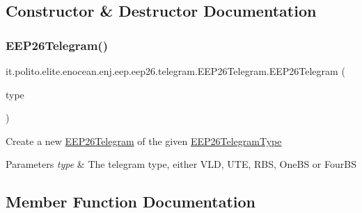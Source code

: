 \subsection{Constructor \& Destructor Documentation}
\hypertarget{classit_1_1polito_1_1elite_1_1enocean_1_1enj_1_1eep_1_1eep26_1_1telegram_1_1_e_e_p26_telegram_a880474d00eda1be1f7234ac34330d348}{}\label{classit_1_1polito_1_1elite_1_1enocean_1_1enj_1_1eep_1_1eep26_1_1telegram_1_1_e_e_p26_telegram_a880474d00eda1be1f7234ac34330d348} 
\subsubsection{\texorpdfstring{E\+E\+P26\+Telegram()}{EEP26Telegram()}}
{\footnotesize\ttfamily it.\+polito.\+elite.\+enocean.\+enj.\+eep.\+eep26.\+telegram.\+E\+E\+P26\+Telegram.\+E\+E\+P26\+Telegram (\begin{DoxyParamCaption}\item[{\hyperlink{enumit_1_1polito_1_1elite_1_1enocean_1_1enj_1_1eep_1_1eep26_1_1telegram_1_1_e_e_p26_telegram_type}{E\+E\+P26\+Telegram\+Type}}]{type }\end{DoxyParamCaption})}

Create a new \hyperlink{classit_1_1polito_1_1elite_1_1enocean_1_1enj_1_1eep_1_1eep26_1_1telegram_1_1_e_e_p26_telegram}{E\+E\+P26\+Telegram} of the given \hyperlink{enumit_1_1polito_1_1elite_1_1enocean_1_1enj_1_1eep_1_1eep26_1_1telegram_1_1_e_e_p26_telegram_type}{E\+E\+P26\+Telegram\+Type} 
\begin{DoxyParams}{Parameters}
{\em type} & The telegram type, either V\+LD, U\+TE, R\+BS, One\+BS or Four\+BS \\
\hline
\end{DoxyParams}


\subsection{Member Function Documentation}
\hypertarget{classit_1_1polito_1_1elite_1_1enocean_1_1enj_1_1eep_1_1eep26_1_1telegram_1_1_e_e_p26_telegram_a766a6d1008fb5491829af6583d7de622}{}\label{classit_1_1polito_1_1elite_1_1enocean_1_1enj_1_1eep_1_1eep26_1_1telegram_1_1_e_e_p26_telegram_a766a6d1008fb5491829af6583d7de622} 
